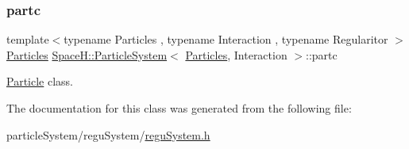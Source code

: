 \subsubsection{\texorpdfstring{partc}{partc}}
{\footnotesize\ttfamily template$<$typename Particles , typename Interaction , typename Regularitor $>$ \\
\mbox{\hyperlink{struct_space_h_1_1_particles}{Particles}} \mbox{\hyperlink{class_space_h_1_1_particle_system}{Space\+H\+::\+Particle\+System}}$<$ \mbox{\hyperlink{struct_space_h_1_1_particles}{Particles}}, Interaction $>$\+::partc}



\mbox{\hyperlink{struct_space_h_1_1_particle}{Particle}} class. 



The documentation for this class was generated from the following file\+:\begin{DoxyCompactItemize}
\item 
particle\+System/regu\+System/\mbox{\hyperlink{regu_system_8h}{regu\+System.\+h}}\end{DoxyCompactItemize}

